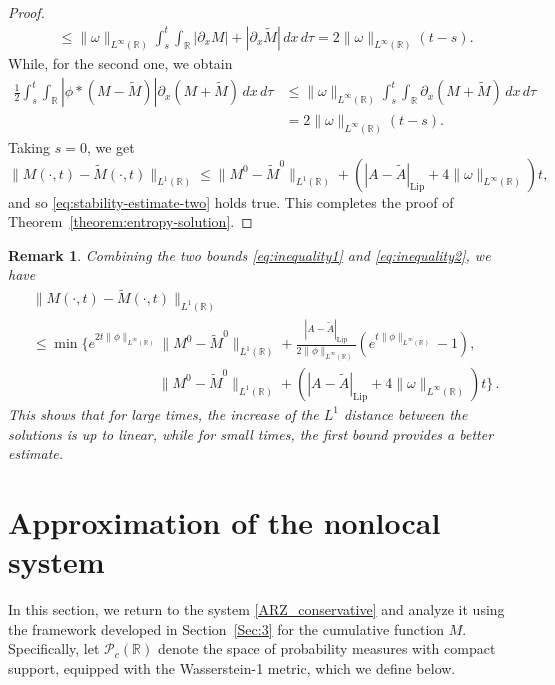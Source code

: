 \documentclass[11pt,a4paper,oneside]{amsart}
\newtheorem{rem}[definition]{Remark}
\newcommand\blu{\color{black}}
\newcommand\R{\mathbb{R}}
\newcommand{\PP}{\mathcal{P}}
\newcommand{\Lip}{\text{Lip}}
\begin{document}
\begin{proof}
\begin{align*}
    & \leq \|\omega\|_{L^\infty(\R)}\int_s^t\int_\R |\partial_x M|+|\partial_x \tilde M|\,dx\,d\tau=2\|\omega\|_{L^\infty(\R)}(t-s).
\end{align*}
While, for the second one, we obtain
\begin{align*}
    \frac{1}{2}  \int_s^t\int_\R |\phi\ast(M-\tilde M)|\partial_x(M+\tilde M)\,dx\,d\tau &\leq \|\omega\|_{L^\infty(\R)} \int_s^t\int_\R \partial_x (M+\tilde M)\,dx\,d\tau\\
    & = 2\|\omega\|_{L^\infty(\R)}(t-s).
\end{align*}
Taking $s=0$, we get
\begin{equation}\label{eq:inequality2}
    \|M(\cdot,t)-\tilde M(\cdot,t)\|_{L^1(\R)} \leq \| M^0-\tilde M^0\|_{L^1(\R)}+(|A-\tilde A|_{\Lip}+4\|\omega\|_{L^\infty(\R)})t,
\end{equation}
and so \eqref{eq:stability-estimate-two} holds true. 
This completes the proof of Theorem~\ref{theorem:entropy-solution}.
\end{proof}

\begin{rem} Combining the two bounds \eqref{eq:inequality1} and \eqref{eq:inequality2}, we have
    \begin{align*}
        &\|M(\cdot,t)-\tilde M(\cdot,t)\|_{L^1(\R)}\\
        &\leq \min\Big\{ e^{2t\|\phi\|_{L^\infty(\R)}}\|M^0-\tilde M^0\|_{L^1(\R)}+\frac{|A-\tilde A|_{\Lip}}{2\|\phi\|_{L^\infty(\R)}}(e^{t\|\phi\|_{L^\infty(\R)}}-1),\\ 
        & \hspace{7em}\qquad 
        \| M^0-\tilde M^0\|_{L^1(\R)} +\left(|A-\tilde A|_{\Lip}+4\|\omega\|_{L^\infty(\R)}\right)t\Big\}\,.
    \end{align*}
    This shows that for large times, the increase of the $L^1$ distance between the solutions is up to linear, while for small times, 
    the first bound provides a better estimate.
\end{rem}

\section{Approximation of the nonlocal system}\label{Sec:4}
\setcounter{equation}{0}

{\blu In this section, we return to the system \eqref{ARZ_conservative} and analyze it using the framework developed in Section~\ref{Sec:3} for the cumulative function $M$.
Specifically, let $\PP_c(\R)$ denote the space of probability measures with compact support, equipped with the Wasserstein-1 metric, which we define below.}
\end{document}
